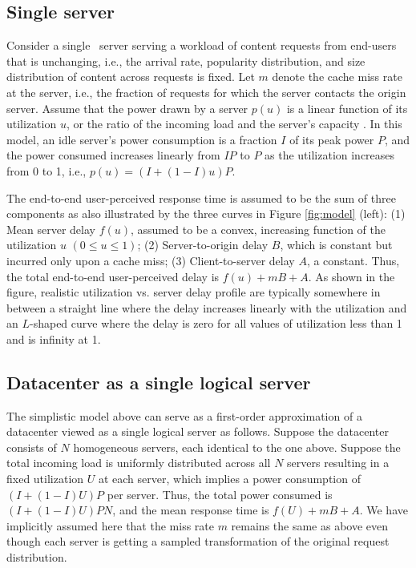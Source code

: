 \subsection{Single server}
\label{sec:singleserver}
Consider a single \cdc\ server serving a workload of content requests from end-users that is unchanging, i.e., the arrival rate, popularity distribution, and size distribution of content across requests is fixed. Let $m$ denote the cache miss rate at the server, i.e., the fraction of requests for which the server contacts the origin server. Assume that the power drawn by a server $p(u)$ is a linear function of its utilization $u$, or the ratio of the incoming load and the server's capacity \cite{mathew12}. In this model, an idle server's power consumption is a fraction $I$ of its peak power $P$, and the power consumed increases linearly from $IP$ to $P$ as the utilization increases from 0 to 1, i.e., $p(u) = (I + (1-I)u)P$.

The end-to-end user-perceived response time is assumed to be the sum of three components as also illustrated by the three curves in Figure \ref{fig:model} (left): (1) Mean server delay $f(u)$, assumed to be a convex, increasing function of the utilization $u$ $(0\leq u\leq1)$; (2) Server-to-origin delay $B$, which is constant but incurred only upon a cache miss; (3) Client-to-server delay $A$, a constant. Thus, the total end-to-end user-perceived delay is $f(u) + mB + A$. As shown in the figure, realistic utilization vs. server delay profile are typically somewhere in between a straight line where the delay increases linearly with the utilization and an $L$-shaped curve where the delay is zero for all values of utilization less than 1 and is infinity at 1.

\subsection{Datacenter as a single logical server}
\label{sec:multiserver}

The simplistic model above can serve as a first-order approximation of a datacenter viewed as a single logical server as follows. Suppose the datacenter consists of $N$ homogeneous servers, each identical to the one above. Suppose the total incoming load is uniformly distributed across all $N$ servers resulting in a fixed utilization $U$ at each server, which implies a power consumption of $(I+(1-I)U)P$ per server. Thus, the total power consumed is $(I+(1-I)U)PN$, and the mean response time is $f(U) + mB + A$. We have implicitly assumed here that the miss rate $m$ remains the same as above even though each server is getting a sampled transformation of the original request distribution.

